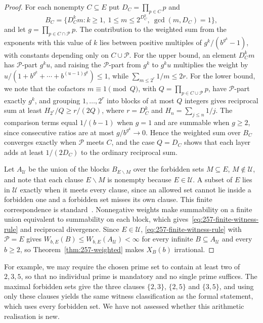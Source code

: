 \begin{proof}
For each nonempty $C\subseteq E$ put $D_C=\prod_{p\in C}p$ and
\[
 B_C=\{D_C^km:k\ge1,\ 1\le m\le2^{D_C^k},\ \gcd(m,D_C)=1\},
\]
and let $g=\prod_{p\in C\cap\mathcal P}p$. The contribution to the
weighted sum from the exponents with this value of $k$ lies between
positive multiples of $g^k/(b^{g^k}-1)$, with constants depending only
on $C\cup\mathcal P$. For the upper bound, an element $D_C^km$ has
$\mathcal P$-part $g^ku$, and raising the $\mathcal P$-part from $g^k$ to
$g^ku$ multiplies the weight by
$u/(1+b^{g^k}+\cdots+b^{(u-1)g^k})\le1$, while
$\sum_{m\le2^r}1/m\le2r$. For the lower bound, we note that the cofactors $m\equiv1\pmod Q$, with
$Q=\prod_{p\in C\cup\mathcal P}p$, have $\mathcal P$-part exactly $g^k$,
and grouping $1,\dots,2^r$ into blocks of at most $Q$ integers gives
reciprocal sum at least $H_{2^r}/Q\ge r/(2Q)$, where $r=D_C^k$ and
$H_n=\sum_{j\le n}1/j$.  The comparison terms equal $1/(b-1)$ when $g=1$
and are summable when $g\ge2$, since consecutive ratios are at most
$g/b^{g^k}\to0$.  Hence the weighted sum over $B_C$ converges exactly when
$\mathcal P$ meets $C$, and the case $Q=D_C$ shows that each layer adds at
least $1/(2D_C)$ to the ordinary reciprocal sum.

Let $A_{\mathcal U}$ be the union of the blocks $B_{E\smallsetminus M}$ over
the forbidden sets $M\subseteq E$, $M\notin\mathcal U$, and note that each
clause $E\smallsetminus M$ is nonempty because $E\in\mathcal U$.  A subset of $E$ lies
in $\mathcal U$ exactly when it meets every clause, since an allowed set
cannot lie inside a forbidden one and a forbidden set misses its own clause.
This finite correspondence is standard~\cite[Section~2]{sedaghatstephenchindelevitch}.
Nonnegative weights make summability on a finite union equivalent to
summability on each block, which gives~\eqref{eq:257-finite-witness-rule}
and reciprocal divergence.  Since $E\in\mathcal U$,
\eqref{eq:257-finite-witness-rule} with $\mathcal P=E$ gives
$W_{b,E}(B)\le W_{b,E}(A_{\mathcal U})<\infty$ for every infinite
$B\subseteq A_{\mathcal U}$ and every $b\ge2$, so
Theorem~\ref{thm:257-weighted} makes $X_B(b)$ irrational.
\end{proof}

For example, we may require the chosen prime set to contain at least two
of $2,3,5$, so that no individual prime is mandatory and no single prime
suffices. The maximal forbidden sets give the three clauses $\{2,3\}$,
$\{2,5\}$ and $\{3,5\}$, and using only these clauses yields the same
witness classification as the formal statement, which uses every
forbidden set. We have not assessed whether this arithmetic realisation
is new.

